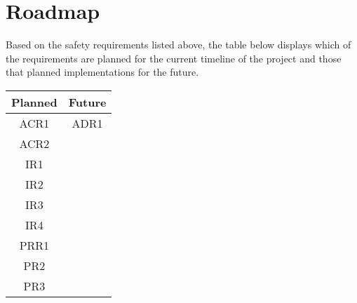 \documentclass{article}
\begin{document}
	
	\section{Roadmap}
	
	
	Based on the safety requirements listed above, the table below displays which of the requirements are planned for the current timeline of the project and those that planned implementations for the future.
	
	\begin{center}
		\begin{tabular}{ |c|c| } 
			\hline
			Planned & Future \\
			\hline 
			\hline
			ACR1 & ADR1 \\ 
			\hline
			ACR2 & \\
			\hline
			IR1 & \\
			\hline
			IR2 & \\
			\hline
			IR3 & \\
			\hline
			IR4 & \\
			\hline 
			PRR1 & \\ 
			\hline
			PR2 & \\
			\hline
			PR3 & \\
			\hline
		\end{tabular}
	\end{center}
\end{document}
